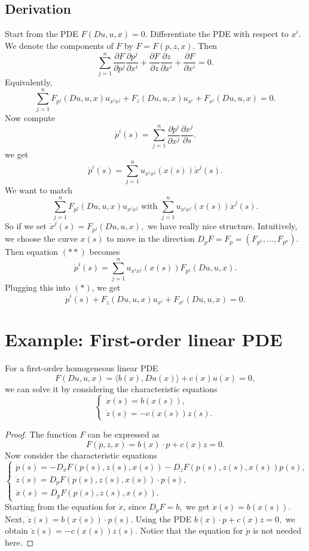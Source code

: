 \subsection*{Derivation}
Start from the PDE
$
F(Du,u,x)=0.
$
Differentiate the PDE with respect to $x^i$. We denote the components of $F$ by
$
F=F(p,z,x).
$
Then
$$
\sum_{j=1}^n
\frac{\partial F}{\partial p^j}
\frac{\partial p^j}{\partial x^i}
+
\frac{\partial F}{\partial z}
\frac{\partial z}{\partial x^i}
+
\frac{\partial F}{\partial x^i}
=0.
$$
Equivalently,
\begin{equation}
\sum_{j=1}^n
F_{p^j}(Du,u,x)u_{x^i x^j}
+
F_z(Du,u,x)u_{x^i}
+
F_{x^i}(Du,u,x)
=0.
\tag{*}
\end{equation}
Now compute
$$
\dot{p}^i(s)
=
\sum_{j=1}^n
\frac{\partial p^i}{\partial x^j}
\frac{\partial x^j}{\partial s}.
$$
we get
\begin{equation}
\dot{p}^i(s)
=
\sum_{j=1}^n
u_{x^i x^j}(x(s))\dot{x}^j(s).
\tag{**}
\end{equation}
We want to match
$$
\sum_{j=1}^n
F_{p^j}(Du,u,x)u_{x^i x^j}
\text{ with }
\sum_{j=1}^n
u_{x^i x^j}(x(s))\dot{x}^j(s).
$$
So if we set
$
\dot{x}^j(s)=F_{p^j}(Du,u,x),
$
we have really nice structure. Intuitively, we choose the curve $x(s)$ to move in the direction
$
D_pF=F_p=(F_{p^1},\ldots,F_{p^n}).
$
Then equation $(**)$ becomes
$$
\dot{p}^i(s)
=
\sum_{j=1}^n
u_{x^i x^j}(x(s))F_{p^j}(Du,u,x).
$$
Plugging this into $(*)$, we get
$$
\dot{p}^i(s)
+
F_z(Du,u,x)u_{x^i}
+
F_{x^i}(Du,u,x)
=0.
$$



\section*{Example: First-order linear PDE}

\begin{claim}
For a first-order homogeneous linear PDE
$$
F(Du,u,x)=\langle b(x),Du(x)\rangle+c(x)u(x)=0,
$$
we can solve it by considering the characteristic equations
$$
\begin{cases}
\dot{x}(s)=b(x(s)),\\
\dot{z}(s)=-c(x(s))z(s).
\end{cases}
$$
\end{claim}

\begin{proof}
The function $F$ can be expressed as
$$
F(p,z,x)=b(x)\cdot p+c(x)z=0.
$$
Now consider the characteristic equations
$$
\begin{cases}
\dot{p}(s)
=
-D_xF(p(s),z(s),x(s))
-
D_zF(p(s),z(s),x(s))p(s),\\
\dot{z}(s)
=
D_pF(p(s),z(s),x(s))\cdot p(s),\\
\dot{x}(s)
=
D_pF(p(s),z(s),x(s)).
\end{cases}
$$
Starting from the equation for $\dot{x}$, since
$
D_pF=b,
$
we get
$
\dot{x}(s)=b(x(s)).
$
Next,
$
\dot{z}(s)=b(x(s))\cdot p(s).
$
Using the PDE
$
b(x)\cdot p+c(x)z=0,
$
we obtain
$
\dot{z}(s)=-c(x(s))z(s).
$
Notice that the equation for $\dot{p}$ is not needed here.
\end{proof}

